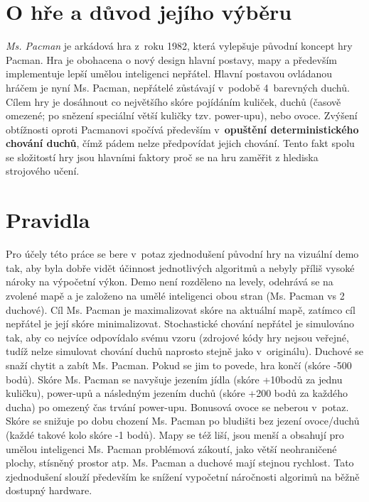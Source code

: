 \section{O hře a důvod jejího výběru}
\textit{Ms. Pacman} je arkádová hra z roku 1982, která vylepšuje původní koncept hry Pacman. Hra je obohacena o nový design hlavní postavy, mapy a především implementuje lepší umělou inteligenci nepřátel. Hlavní postavou ovládanou hráčem je nyní Ms. Pacman, nepřátelé zůstávají v podobě 4 barevných duchů. Cílem hry je dosáhnout co největšího skóre pojídáním kuliček, duchů (časově omezené; po snězení speciální větší kuličky tzv. power-upu), nebo ovoce.
Zvýšení obtížnosti oproti Pacmanovi spočívá především v \textbf{opuštění deterministického chování duchů}, čímž pádem nelze předpovídat jejich chování. Tento fakt spolu se složitostí hry jsou hlavními faktory proč se na hru zaměřit z hlediska strojového učení.
\section{Pravidla}
Pro účely této práce se bere v potaz zjednodušení původní hry na vizuální demo tak, aby byla dobře vidět účinnost jednotlivých algoritmů a nebyly příliš vysoké nároky na výpočetní výkon. Demo není rozděleno na levely, odehrává se na zvolené mapě a je založeno na umělé inteligenci obou stran (Ms. Pacman vs 2 duchové). Cíl Ms. Pacman je maximalizovat skóre na aktuální mapě, zatímco cíl nepřátel je její skóre minimalizovat. Stochastické chování nepřátel je simulováno tak, aby co nejvíce odpovídalo svému vzoru (zdrojové kódy hry nejsou veřejné, tudíž nelze simulovat chování duchů naprosto stejně jako v originálu). Duchové se snaží chytit a zabít Ms. Pacman. Pokud se jim to povede, hra končí (skóre -500 bodů). Skóre Ms. Pacman se navyšuje jezením jídla (skóre +10bodů za jednu kuličku), power-upů a následným jezením duchů (skóre +200 bodů za každého ducha) po omezený čas trvání power-upu. Bonusová ovoce se neberou v potaz. Skóre se snižuje po dobu chození Ms. Pacman po bludišti bez jezení ovoce/duchů (každé takové kolo skóre -1 bodů). Mapy se též liší, jsou menší a obsahují pro umělou inteligenci Ms. Pacman problémová zákoutí, jako větší neohraničené plochy, stísněný prostor atp. Ms. Pacman a duchové mají stejnou rychlost. Tato zjednodušení slouží především ke snížení vypočetní náročnosti algorimů na běžně dostupný hardware.
